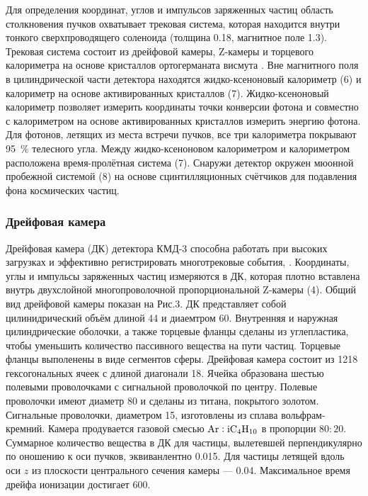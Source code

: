 Для определения координат,
углов и импульсов заряженных частиц область столкновения пучков
охватывает трековая система,
которая находится внутри тонкого сверхпроводящего соленоида (толщина
\SI{0.18}{\Xrad},
магнитное поле \SI{1.3}{\teslaru}). 
Трековая система состоит из дрейфовой камеры,
Z-камеры и торцевого калориметра на основе кристаллов ортогерманата висмута .
Вне магнитного поля в цилиндрической части детектора находятся жидко-ксеноновый калориметр (6)
и калориметр на основе активированных кристаллов (7). 
Жидко-ксеноновый калориметр позволяет измерить координаты точки конверсии фотона и совместно с калориметром на основе активированных кристаллов  измерить энергию фотона.
Для фотонов, летящих из места встречи пучков, все три калориметра покрывают \SI{95}{\percent} телесного угла.
Между жидко-ксеноновом калориметром и  калориметром расположена время-пролётная система (7).
Снаружи детектор окружен мюонной пробежной системой (8) на основе сцинтилляционных счётчиков для
подавления фона космических частиц.


\subsubsection{Дрейфовая камера}
\label{sec:dc}

Дрейфовая камера (ДК) детектора КМД-3 способна работать при высоких загрузках и эффективно регистрировать многотрековые события, \cite{driftChCMD3Grancagnolo2010}. 
Координаты, углы и импульсы заряженных частиц измеряются в ДК,
которая плотно вставлена внутрь двухслойной многопроволочной пропорциональной Z-камеры (4). 
Общий вид дрейфовой камеры показан на Рис.3.
ДК представляет собой цилинидрический объём длиной \SI{44}{\cmr} и диаемтром \SI{60}{\cmr}.
Внутренняя и наружная цилиндрические оболочки,
а также торцевые фланцы сделаны из углепластика,
чтобы уменьшить количество пассивного вещества на пути частиц.
Торцевые фланцы выполенены в виде сегментов сферы.
Дрейфовая камера состоит из \num{1218} гексогональных ячеек с длиной диагонали \SI{18}{\mmr}.
Ячейка образована шестью полевыми проволочками с сигнальной проволочкой по центру.
Полевые проволочки имеют диаметр \SI{80}{\umr} и сделаны из титана, покрытого золотом. 
Сигнальные проволочки,
диаметром \SI{15}{\umr},
изготовлены из сплава вольфрам-кремний.
Камера продувается газовой смесью $\ce{Ar}:\ce{iC4H10}$ в пропорции $80:20$.
Суммарное количество вещества в ДК для частицы,
вылетевшей перпендикулярно по оношению к оси пучков,
эквиванлентно \SI{0.015}{\Xrad}.
Для частицы летящей вдоль оси $z$ из плоскости центрального сечения камеры
--- \SI{0.04}{\Xrad}.
Максимальное время дрейфа ионизации достигает \SI{600}{\nsr}.

